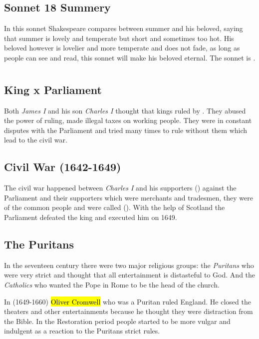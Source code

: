 \documentclass[12pt, a4paper]{article}
\begin{document}
{\subsection*{Sonnet 18 Summery}
{\fontpar
In this sonnet Shakespeare compares between summer and his beloved, saying that summer is lovely and temperate
but short and sometimes too hot. His beloved however is 
lovelier and more temperate and does not fade, as long as 
people can see and read, this sonnet will make his beloved eternal. The 
sonnet is .
}

\section*{}
\subsection*{King x Parliament}

Both \textit{James I} and his son \textit{Charles I} thought that kings ruled 
by . They abused the power of ruling, made illegal taxes
on working people. They were in constant disputes with the Parliament and tried 
many times to rule without them which lead to the civil war.

\subsection*{Civil War (1642-1649)}

The civil war happened between \textit{Charles I} and his supporters 
() against the Parliament and their supporters which were
merchants and tradesmen, they were of the common people and were called (). 
With the help of Scotland the Parliament defeated the king and executed him on 1649.

\subsection*{The Puritans}

In the seventeen century there were two major religious groups: the
\textit{Puritans} who were very strict and thought that all entertainment is
distasteful to God. And the \textit{Catholics} who wanted the Pope in Rome to 
be the head of the church.\medbreak

In (1649-1660) \hl{Oliver Cromwell} who was a Puritan ruled England. He closed the 
theaters and other entertainments because he thought they were distraction
from the Bible. In the Restoration period people started to be more vulgar and 
indulgent as a reaction to the Puritans strict rules.


}
\end{document}
